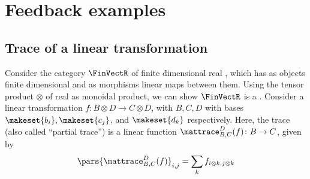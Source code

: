 
\section{Feedback examples}
\publictodomessage

\subsection{Trace of a linear transformation}
\label{subsec:trace-linear}
Consider the category $\FinVectR$ of finite dimensional real , which has as objects finite dimensional  and as morphisms linear maps between them.
Using the tensor product $\otimes$ of real  as monoidal product, we can show $\FinVectR$ is a .
Consider a linear transformation $f\colon B\otimes D\to C\otimes D$, with $B,C,D$  with bases $\makeset{b_i},\makeset{c_j}$, and $\makeset{d_k}$ respectively.
Here, the trace (also called ``partial trace'') is a linear function $\mattrace_{B,C}
    ^D(f)\colon B\to C$, given by
\begin{equation}
    \pars{\mattrace_{B,C}
        ^D(f) }_{i,j}=\sum_{k}f_{i\otimes k,j\otimes k}
\end{equation}


